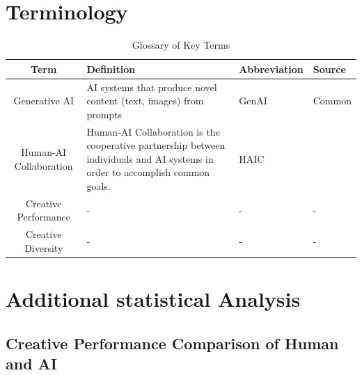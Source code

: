 \documentclass[acmsmall,authorversion]{acmart}
\begin{document}
\section{Terminology}

\begin{table}[ht]
\centering
\caption{Glossary of Key Terms}
    \label{tab:Terminology}
    \begin{tabular}{c p{5cm} l l}
        \toprule
        \textbf{Term} & \textbf{Definition} & \textbf{Abbreviation} & \textbf{Source}\\
        \midrule
        Generative AI & AI systems that produce novel content (text, images) from prompts & GenAI & Common\\
        Human-AI Collaboration &  Human‑AI Collaboration is the cooperative partnership between individuals and AI systems in order to accomplish common goals. & HAIC & \cite{fragiadakis2025evaluatinghumanaicollaborationreview} \\
        Creative Performance & - & - & - \\
        Creative Diversity & - & - & - \\
        \bottomrule
    \end{tabular}
\end{table}

\section{Additional statistical Analysis}
\subsection{Creative Performance Comparison of Human and AI}
\end{document}
